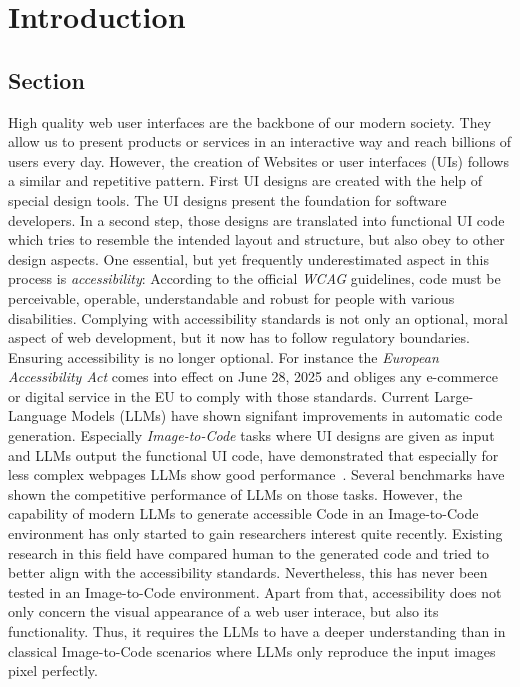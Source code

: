 
\chapter{Introduction}\label{chapter:introduction}

\section{Section}
High quality web user interfaces are the backbone of our modern society. They allow us 
to present products or services in an interactive way and reach billions of users every day.
However, the creation of Websites or user interfaces (UIs) follows a similar and repetitive 
pattern. \newline
First UI designs are created with the help of special design tools. The UI designs present 
the foundation for software developers. In a second step, those designs are translated into 
functional UI code which tries to resemble the intended layout and structure, but also obey
to other design aspects. \newline
One essential, but yet frequently underestimated aspect in this process is \textit{accessibility}:
According to the official \textit{WCAG} guidelines, code must be  perceivable, operable, 
understandable and robust for people with various disabilities.\newline
Complying with accessibility standards is not only an optional, moral aspect of 
web development, but it now has to follow regulatory boundaries. Ensuring accessibility
is no longer optional. For instance the \textit{European Accessibility Act} comes into 
effect on June 28, 2025 and obliges any e-commerce or digital service in the EU 
to comply with those standards.\newline
Current Large-Language Models (LLMs) have shown signifant improvements in automatic
code generation. Especially \textit{Image-to-Code} tasks where UI designs are given as 
input and LLMs output the functional UI code, have demonstrated that especially for 
less complex webpages LLMs show good performance~\parencite{si2024design2code}. 
Several benchmarks have shown the competitive performance of LLMs on those tasks.
However, the capability of modern LLMs to generate accessible Code in an Image-to-Code 
environment has only started to gain researchers interest quite recently. Existing 
research in this field have compared human to the generated code and tried to better
align with the accessibility standards. Nevertheless, this has never been tested in 
an Image-to-Code environment. Apart from that, accessibility does not only concern 
the visual appearance of a web user interace, but also its functionality. Thus, it 
requires the LLMs to have a deeper understanding than in classical Image-to-Code scenarios
where LLMs only reproduce the input images pixel perfectly.

